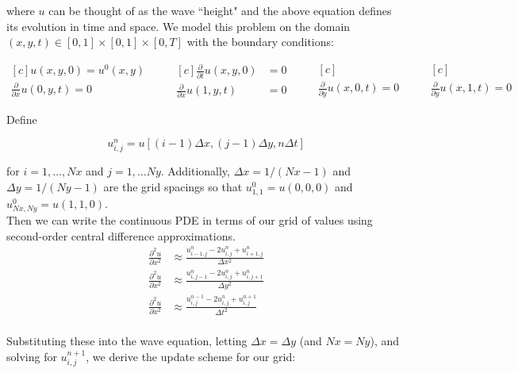 \documentclass[12pt]{article}
\begin{document}
where $u$ can be thought of as the wave ``height" and the above equation defines its evolution in time and space.  We model this problem on the domain $(x,y,t) \in [0,1] \times [0,1] \times [0, T]$ with the boundary conditions:

\begin{equation*}
\begin{aligned}[c]
u(x,y,0) = u^0(x,y)\\
\frac{\partial}{\partial x}u(0,y,t)=0
\end{aligned}
\qquad
\begin{aligned}[c]
\frac{\partial}{\partial t}u(x,y,0)&=0 \\
\frac{\partial}{\partial x}u(1,y,t)&=0
\end{aligned}
\qquad
\begin{aligned}[c]
\\
\frac{\partial}{\partial y}u(x,0,t)=0
\end{aligned}
\qquad
\begin{aligned}[c]
\\
\frac{\partial}{\partial y}u(x,1,t)=0
\end{aligned}
\end{equation*}

Define

$$
u^n_{i,j}=u[(i-1)\Delta x,(j-1)\Delta y, n\Delta t]
$$

for $i = 1, \hdots, Nx$ and $j = 1,\hdots Ny$.  Additionally, $\Delta x = 1/(Nx-1)$ and $\Delta y = 1/(Ny-1)$ are the grid spacings so that $u^0_{1,1} = u(0,0,0)$ and $u^0_{Nx, Ny} = u(1,1,0)$.\\

Then we can write the continuous PDE in terms of our grid of values using second-order central difference approximations.\\

\begin{equation*}
\begin{aligned}
\frac{\partial^2 u}{\partial x^2} &\approx \frac{u^n_{i-1,j}-2u^n_{i,j}+u^n_{i+1,j}}{\Delta x^2} \\
\frac{\partial^2 u}{\partial x^2} &\approx \frac{u^n_{i,j-1}-2u^n_{i,j}+u^n_{i,j+1}}{\Delta y^2} \\
\frac{\partial^2 u}{\partial x^2} &\approx \frac{u^{n-1}_{i,j}-2u^n_{i,j}+u^{n+1}_{i,j}}{\Delta t^2} \\
\end{aligned}
\end{equation*}

Substituting these into the wave equation, letting $\Delta x = \Delta y$ (and $Nx = Ny$), and solving for $u^{n+1}_{i,j}$, we derive the update scheme for our grid:
\end{document}
